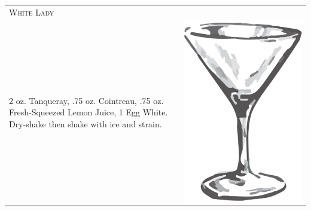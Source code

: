 \documentclass{article}
\begin{document}
\begin{multicols}{2}
\begin{tabular}{p{2in} p{0.5in}}
\multicolumn{2}{p{3in}}{\centering\Huge\textsc{White Lady}} \\ 
   \vspace{-0.1in}2 oz. Tanqueray, .75 oz. Cointreau, .75 oz. Fresh-Squeezed Lemon Juice, 1 Egg White. Dry-shake then shake with ice and strain.&
   \vspace{-0.1in} \includegraphics{goblet.png}
\end{tabular}
\end{multicols}
\end{document}
